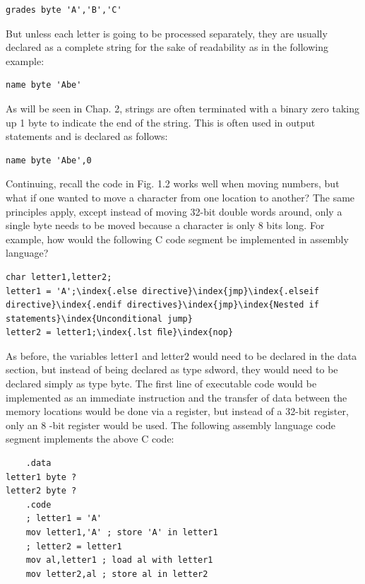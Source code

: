 \documentclass[10pt]{book}
\begin{document}
\begin{verbatim}
grades byte 'A','B','C'
\end{verbatim}

But unless each letter is going to be processed separately, they are usually declared as a complete string for the sake of readability as in the following example:

\begin{verbatim}
name byte 'Abe'
\end{verbatim}

As will be seen in Chap. 2, strings are often terminated with a binary zero taking up 1 byte to indicate the end of the string. This is often used in output statements and is declared as follows:

\begin{verbatim}
name byte 'Abe',0
\end{verbatim}

Continuing, recall the code in Fig. 1.2 works well when moving numbers, but what if one wanted to move a character from one location to another? The same principles apply, except instead of moving 32-bit double words around, only a single byte needs to be moved because a character is only 8 bits long. For example, how would the following C code segment be implemented in assembly language?

\begin{verbatim}
char letter1,letter2;
letter1 = 'A';\index{.else directive}\index{jmp}\index{.elseif directive}\index{.endif directives}\index{jmp}\index{Nested if statements}\index{Unconditional jump}
letter2 = letter1;\index{.lst ﬁle}\index{nop}
\end{verbatim}

As before, the variables letter1 and letter2 would need to be declared in the data section, but instead of being declared as type sdword, they would need to be declared simply as type byte. The first line of executable code would be implemented as an immediate instruction and the transfer of data between the memory locations would be done via a register, but instead of a 32-bit register, only an 8 -bit register would be used. The following assembly language code segment implements the above C code:

\begin{verbatim}
    .data
letter1 byte ?
letter2 byte ?
    .code
    ; letter1 = 'A'
    mov letter1,'A' ; store 'A' in letter1
    ; letter2 = letter1
    mov al,letter1 ; load al with letter1
    mov letter2,al ; store al in letter2
\end{verbatim}
\end{document}
